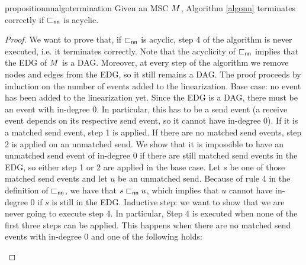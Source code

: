 \begin{restatable}{proposition}{nnalgotermination}
\label{prop:nn_algo_term}
	Given an MSC $M$, Algorithm \ref{algonn}  terminates correctly if $\sqsubset_{\mathsf{nn}}$ is acyclic.
\end{restatable}
\begin{proof}
	We want to prove that, if $\sqsubset_{\mathsf{nn}}$ is acyclic, step 4 of the algorithm is never executed, i.e. it terminates correctly. Note that the acyclicity of $\sqsubset_{\mathsf{nn}}$ implies that the EDG of $M$ is a DAG. Moreover, at every step of the algorithm we remove nodes and edges from the EDG, so it still remains a DAG. The proof proceeds by induction on the number of events added to the linearization.\newline
	Base case: no event has been added to the linearization yet. Since the EDG is a DAG, there must be an event with in-degree 0. In particular, this has to be a send event (a receive event depends on its respective send event, so it cannot have in-degree 0). If it is a matched send event, step 1 is applied. If there are no matched send events, step 2 is applied on an unmatched send. We show that it is impossible to have an unmatched send event of in-degree 0 if there are still matched send events in the EDG, so either step 1 or 2 are applied in the base case. Let $s$ be one of those matched send events and let $u$ be an unmatched send. Because of rule 4 in the definition of $\sqsubset_{\mathsf{nn}}$, we have that $s \sqsubset_{\mathsf{nn}} u$, which implies that $u$ cannot have in-degree 0 if $s$ is still in the EDG.\newline
	Inductive step: we want to show that we are never going to execute step 4. In particular, Step 4 is executed when none of the first three steps can be applied. This happens when there are no matched send events with in-degree 0 and one of the following holds:
	\begin{itemize}%

\end{itemize}
\end{proof}
